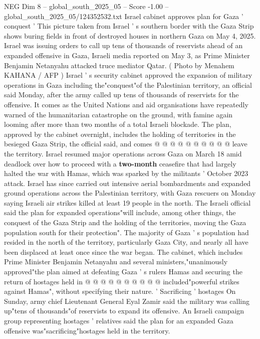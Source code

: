 \begin{textsample}{NEG Dim 8 – global\_south\_2025\_05 – Score -1.00 – global\_south\_2025\_05/124352532.txt}  \label{ex:f8_neg_016}
Israel cabinet approves plan for Gaza ' conquest ' This picture taken from Israel ' s southern border with the Gaza Strip shows buring fields in front of destroyed houses in northern Gaza on May 4, 2025.
Israel was issuing orders to call up tens of thousands of reservists ahead of an expanded offensive in Gaza, Israeli media reported on May 3, as Prime Minister Benjamin Netanyahu attacked truce mediator Qatar. ( Photo by Menahem KAHANA / AFP ) Israel ' s security cabinet approved the expansion of military operations in Gaza including the"conquest"of the Palestinian territory, an official said Monday, after the army called up tens of thousands of reservists for the offensive.
It comes as the United Nations and aid organisations have repeatedly warned of the humanitarian catastrophe on the ground, with famine again looming after more than two months of a total Israeli blockade.
The plan, approved by the cabinet overnight, includes the holding of territories in the besieged Gaza Strip, the official said, and comes @ @ @ @ @ @ @ @ @ @ leave the territory.
Israel resumed major operations across Gaza on March 18 amid deadlock over how to proceed with a \textbf{two-month} ceasefire that had largely halted the war with Hamas, which was sparked by the militants ' October 2023 attack.
Israel has since carried out intensive aerial bombardments and expanded ground operations across the Palestinian territory, with Gaza rescuers on Monday saying Israeli air strikes killed at least 19 people in the north.
The Israeli official said the plan for expanded operations"will include, among other things, the conquest of the Gaza Strip and the holding of the territories, moving the Gaza population south for their protection".
The majority of Gaza ' s population had resided in the north of the territory, particularly Gaza City, and nearly all have been displaced at least once since the war began.
The cabinet, which includes Prime Minister Benjamin Netanyahu and several ministers,"unanimously approved"the plan aimed at defeating Gaza ' s rulers Hamas and securing the return of hostages held in @ @ @ @ @ @ @ @ @ @ included"powerful strikes against Hamas", without specifying their nature. ' Sacrificing ' hostages On Sunday, army chief Lieutenant General Eyal Zamir said the military was calling up"tens of thousands"of reservists to expand its offensive.
An Israeli campaign group representing hostages ' relatives said the plan for an expanded Gaza offensive was"sacrificing"hostages held in the territory.

\end{textsample}
